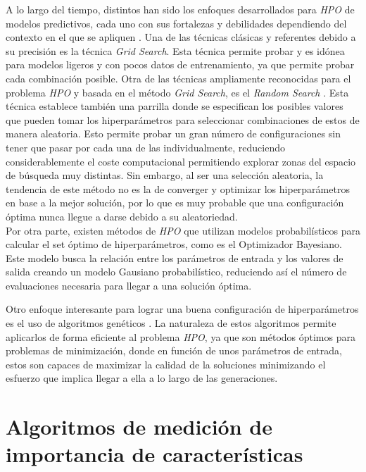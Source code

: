 A lo largo del tiempo, distintos han sido los enfoques desarrollados para \textit{HPO} de modelos predictivos, cada uno con sus fortalezas y debilidades dependiendo del contexto en el que se apliquen \cite{yu2020hyperparameter}. Una de las técnicas clásicas y referentes debido a su precisión es la técnica \textit{Grid Search}. Esta técnica permite probar y es idónea para modelos ligeros y con pocos datos de entrenamiento, ya que permite probar cada combinación posible. Otra de las técnicas ampliamente reconocidas para el problema \textit{HPO} y basada en el método \textit{Grid Search}, es el \textit{Random Search} \cite{bergstra2012random}. Esta técnica establece también una parrilla donde se especifican los posibles valores que pueden tomar los hiperparámetros para seleccionar combinaciones de estos de manera aleatoria. Esto permite probar un gran número de configuraciones sin tener que pasar por cada una de las individualmente, reduciendo considerablemente el coste computacional permitiendo explorar zonas del espacio de búsqueda muy distintas. Sin embargo, al ser una selección aleatoria, la tendencia de este método no es la de converger y optimizar los hiperparámetros en base a la mejor solución, por lo que es muy probable que una configuración óptima nunca llegue a darse debido a su aleatoriedad.\\
Por otra parte, existen métodos de \textit{HPO} que utilizan modelos probabilísticos para calcular el set óptimo de hiperparámetros, como es el Optimizador Bayesiano. Este modelo busca la relación entre los parámetros de entrada y los valores de salida creando un modelo Gausiano probabilístico, reduciendo así el número de evaluaciones necesaria para llegar a una solución óptima.

Otro enfoque interesante para lograr una buena configuración de hiperparámetros es el uso de algoritmos genéticos \cite{alibrahim2021hyperparameter}. La naturaleza de estos algoritmos permite aplicarlos de forma eficiente al problema \textit{HPO}, ya que son métodos óptimos para problemas de minimización, donde en función de unos parámetros de entrada, estos son capaces de maximizar la calidad de la soluciones minimizando el esfuerzo que implica llegar a ella a lo largo de las generaciones.


\section{Algoritmos de medición de importancia de características}
\label{SOAT_FEATURE_IMPORTANCE_METHODS}


